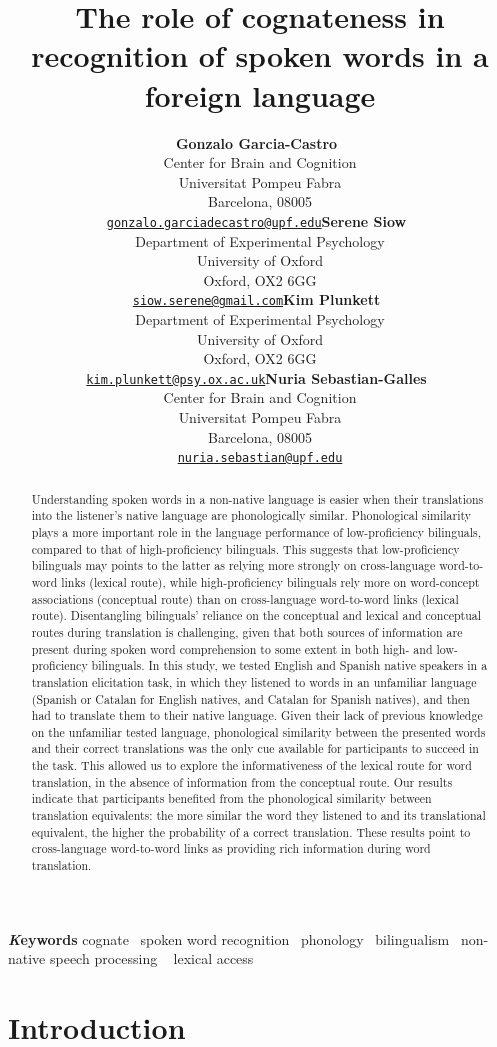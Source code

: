 \documentclass[
]{article}
\title{The role of cognateness in recognition of spoken words in a
foreign language}
\author{\textbf{Gonzalo
Garcia-Castro}~\orcidlink{0000-0002-8553-4209}\\Center for Brain and
Cognition\\Universitat Pompeu Fabra\\Barcelona,
08005\\\texttt{\href{mailto:gonzalo.garciadecastro@upf.edu}{gonzalo.garciadecastro@upf.edu}}\And\textbf{Serene
Siow}~\orcidlink{0000-0001-6482-2191}\\Department of Experimental
Psychology\\University of Oxford\\Oxford, OX2
6GG\\\texttt{\href{mailto:siow.serene@gmail.com}{siow.serene@gmail.com}}\And\textbf{Kim
Plunkett}~\orcidlink{0000-0003-0216-7480}\\Department of Experimental
Psychology\\University of Oxford\\Oxford, OX2
6GG\\\texttt{\href{mailto:kim.plunkett@psy.ox.ac.uk}{kim.plunkett@psy.ox.ac.uk}}\And\textbf{Nuria
Sebastian-Galles}~\orcidlink{0000-0001-6938-2498}\\Center for Brain and
Cognition\\Universitat Pompeu Fabra\\Barcelona,
08005\\\texttt{\href{mailto:nuria.sebastian@upf.edu}{nuria.sebastian@upf.edu}}}
\date{}
\begin{document}
\maketitle
\begin{abstract}
Understanding spoken words in a non-native language is easier when their
translations into the listener's native language are phonologically
similar. Phonological similarity plays a more important role in the
language performance of low-proficiency bilinguals, compared to that of
high-proficiency bilinguals. This suggests that low-proficiency
bilinguals may points to the latter as relying more strongly on
cross-language word-to-word links (lexical route), while
high-proficiency bilinguals rely more on word-concept associations
(conceptual route) than on cross-language word-to-word links (lexical
route). Disentangling bilinguals' reliance on the conceptual and lexical
and conceptual routes during translation is challenging, given that both
sources of information are present during spoken word comprehension to
some extent in both high- and low-proficiency bilinguals. In this study,
we tested English and Spanish native speakers in a translation
elicitation task, in which they listened to words in an unfamiliar
language (Spanish or Catalan for English natives, and Catalan for
Spanish natives), and then had to translate them to their native
language. Given their lack of previous knowledge on the unfamiliar
tested language, phonological similarity between the presented words and
their correct translations was the only cue available for participants
to succeed in the task. This allowed us to explore the informativeness
of the lexical route for word translation, in the absence of information
from the conceptual route. Our results indicate that participants
benefited from the phonological similarity between translation
equivalents: the more similar the word they listened to and its
translational equivalent, the higher the probability of a correct
translation. These results point to cross-language word-to-word links as
providing rich information during word translation.
\end{abstract}
{\bfseries \emph Keywords}
\def\sep{\textbullet\ }
cognate \sep spoken word
recognition \sep phonology \sep bilingualism \sep non-native speech
processing \sep 
lexical access


\section{Introduction}\label{introduction}
\end{document}
